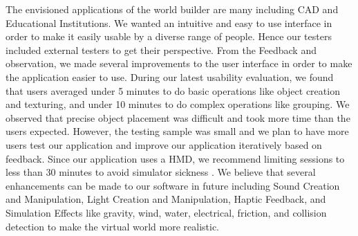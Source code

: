 The envisioned applications of the world builder are many including CAD and Educational Institutions.
We wanted an intuitive and easy to use interface in order to make it easily usable by a diverse range of people.
Hence our testers included external testers to get their perspective.
From the  Feedback and observation, we made several improvements to the user interface in order to make the application easier to use.
During our latest usability evaluation, we found that users averaged under 5 minutes to do basic operations like object creation and texturing, and under 10 minutes to do complex operations like grouping.
We observed that precise object placement was difficult and took more time than the users expected.
However, the testing sample was small and we plan to have more users test our application and improve our application iteratively based on feedback.
Since our application uses a HMD, we recommend limiting sessions to less than 30 minutes to avoid simulator sickness \cite{Kaufmann:Usability}.
We believe that several enhancements can be made to our software in future including Sound Creation and Manipulation, Light Creation and Manipulation, Haptic Feedback, and Simulation Effects like gravity, wind, water, electrical, friction, and collision detection to make the virtual world more realistic.